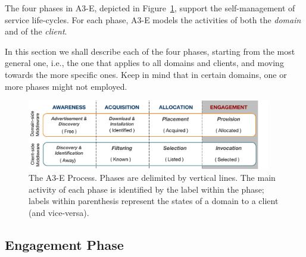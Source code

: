 
The four phases in A3-E, depicted in Figure~\ref{fig:A3-E-process}, support the self-management of service life-cycles. For each phase, A3-E  models the activities of both the \textit{domain} and of the \textit{client}. 

In this section we shall describe each of the four phases, starting from the most general one, i.e., the one that applies to all domains and clients, and moving towards the more specific ones. Keep in mind that in certain domains, one or more phases might not employed.


\begin{figure}[tbp]
	\includegraphics[width=0.95\textwidth]{figs/A3-E-process}
	\caption{The A3-E Process. Phases are delimited by vertical lines. The main activity of each phase is identified by the label within the phase; labels within parenthesis represent the states of a domain to a client (and vice-versa).}
	\label{fig:A3-E-process}
\end{figure}



\subsection*{Engagement Phase}\label{sec:A3-E-engagement}

